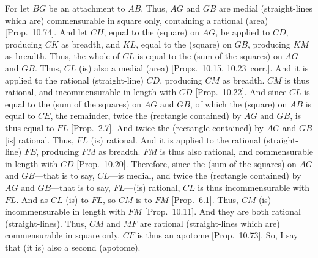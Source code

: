 \begin{Parallel}{}{}
{For let $BG$ be an attachment to $AB$. Thus,
$AG$ and $GB$ are medial (straight-lines which are)
commensurable in square only, containing a rational (area)
[Prop.~10.74]. And let $CH$, equal to
the (square) on $AG$, be applied to $CD$, producing $CK$
as breadth, and $KL$, equal to the (square) on $GB$, producing $KM$ as
breadth. Thus, the whole of $CL$ is equal to the (sum of the squares)
on $AG$ and $GB$. Thus, $CL$ (is) also a medial (area) [Props.~10.15, 10.23~corr.]. And it is
applied to the rational (straight-line) $CD$, producing $CM$ as breadth.
$CM$ is thus rational, and incommensurable in length with
$CD$ [Prop.~10.22]. And since $CL$ is equal to the
(sum of the squares) on $AG$ and $GB$, of which the (square)
on $AB$ is equal to $CE$, 
the remainder, twice  the (rectangle contained) by $AG$ and $GB$, is thus equal to $FL$ [Prop.~2.7]. And twice the (rectangle contained)
by $AG$ and $GB$ [is] rational. Thus, $FL$ (is) rational. And it
is applied to the rational (straight-line) $FE$, producing $FM$ as breadth.
$FM$ is thus also rational, and commensurable in length with $CD$
[Prop.~10.20]. Therefore, since the (sum of the squares) on $AG$ and $GB$---that is to say, $CL$---is medial, 
and twice the (rectangle contained) by $AG$ and $GB$---that is to say,
$FL$---(is) rational, $CL$ is thus incommensurable with $FL$. 
And as $CL$ (is) to $FL$, so $CM$ is to $FM$ [Prop.~6.1]. Thus, $CM$ (is) incommensurable
in length with $FM$ [Prop.~10.11]. And they are both rational (straight-lines). Thus, $CM$ and $MF$ are rational (straight-lines which are) commensurable in square only. $CF$ is thus an
apotome [Prop.~10.73]. So, I say that (it is)
also a second (apotome).

\epsfysize=1.6in
\centerline{}

}
\end{Parallel}
